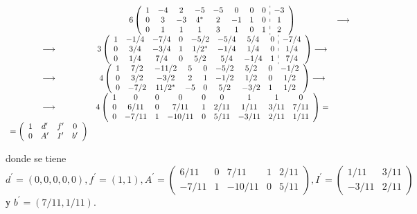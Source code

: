 \documentclass[10pt]{article}
\begin{document}
$$
\begin{array}{ccc} 
& 6\left(\begin{array}{cccccccc:c}
1 & -4 & 2 & -5 & -5 & 0 & 0 & 0 & -3 \\
0 & 3 & -3 & 4^{*} & 2 & -1 & 1 & 0 & 1 \\
0 & 1 & 1 & 1 & 3 & 1 & 0 & 1 & 2
\end{array}\right) & \longrightarrow \\
\longrightarrow & 3\left(\begin{array}{cccccccc:c}
1 & -1 / 4 & -7 / 4 & 0 & -5 / 2 & -5 / 4 & 5 / 4 & 0 & -7 / 4 \\
0 & 3 / 4 & -3 / 4 & 1 & 1 / 2^{*} & -1 / 4 & 1 / 4 & 0 & 1 / 4 \\
0 & 1 / 4 & 7 / 4 & 0 & 5 / 2 & 5 / 4 & -1 / 4 & 1 & 7 / 4
\end{array}\right) \longrightarrow \\
\longrightarrow & 4\left(\begin{array}{ccccccccc}
1 & 7 / 2 & -11 / 2 & 5 & 0 & -5 / 2 & 5 / 2 & 0 & -1 / 2 \\
0 & 3 / 2 & -3 / 2 & 2 & 1 & -1 / 2 & 1 / 2 & 0 & 1 / 2 \\
0 & -7 / 2 & 11 / 2^{*} & -5 & 0 & 5 / 2 & -3 / 2 & 1 & 1 / 2
\end{array}\right) \longrightarrow \\
\longrightarrow & 4\left(\begin{array}{ccccccccc}
1 & 0 & 0 & 0 & 0 & 0 & 1 & 1 & 0 \\
0 & 6 / 11 & 0 & 7 / 11 & 1 & 2 / 11 & 1 / 11 & 3 / 11 & 7 / 11 \\
0 & -7 / 11 & 1 & -10 / 11 & 0 & 5 / 11 & -3 / 11 & 2 / 11 & 1 / 11
\end{array}\right)= \\
=\left(\begin{array}{ccccc}
1 & d^{\prime} & f^{\prime} & 0 \\
0 & A^{\prime} & I^{\prime} & b^{\prime}
\end{array}\right)
\end{array}
$$

donde se tiene $d^{\prime}=(0,0,0,0,0), f^{\prime}=(1,1), A^{\prime}=\left(\begin{array}{ccccc}6 / 11 & 0 & 7 / 11 & 1 & 2 / 11 \\ -7 / 11 & 1 & -10 / 11 & 0 & 5 / 11\end{array}\right), I^{\prime}=\left(\begin{array}{cc}1 / 11 & 3 / 11 \\ -3 / 11 & 2 / 11\end{array}\right)$ у $b^{\prime}=(7 / 11,1 / 11)$.
\end{document}
